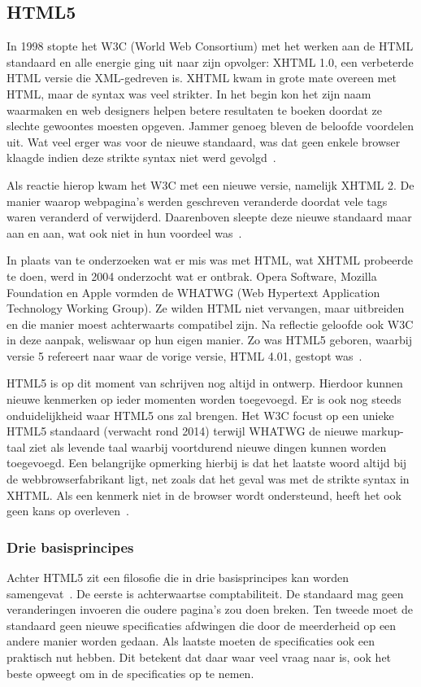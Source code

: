 \subsection{HTML5}
In 1998 stopte het W3C (World Web Consortium) met het werken aan de HTML standaard en alle energie ging uit naar zijn opvolger: XHTML 1.0, een verbeterde HTML versie die XML-gedreven is. XHTML kwam in grote mate overeen met HTML, maar de syntax was veel strikter. In het begin kon het zijn naam waarmaken en web designers helpen betere resultaten te boeken doordat ze slechte gewoontes moesten opgeven. Jammer genoeg bleven de beloofde voordelen uit. Wat veel erger was voor de nieuwe standaard, was dat geen enkele browser klaagde indien deze strikte syntax niet werd gevolgd~\cite{MacDonald2011}.

Als reactie hierop kwam het W3C met een nieuwe versie, namelijk XHTML 2. De manier waarop webpagina's werden geschreven veranderde doordat vele tags waren veranderd of verwijderd. Daarenboven sleepte deze nieuwe standaard maar aan en aan, wat ook niet in hun voordeel was~\cite{MacDonald2011}. 

In plaats van te onderzoeken wat er mis was met HTML, wat XHTML probeerde te doen, werd in 2004 onderzocht wat er ontbrak. Opera Software, Mozilla Foundation en Apple vormden de WHATWG (Web Hypertext Application Technology Working Group). Ze wilden HTML niet vervangen, maar uitbreiden en die manier moest achterwaarts compatibel zijn. Na reflectie geloofde ook W3C in deze aanpak, weliswaar op hun eigen manier.  Zo was HTML5 geboren, waarbij versie 5 refereert naar waar de vorige versie, HTML 4.01, gestopt was~\cite{MacDonald2011}.

HTML5 is op dit moment van schrijven nog altijd in ontwerp. Hierdoor kunnen nieuwe kenmerken op ieder momenten worden toegevoegd.  Er is ook nog steeds onduidelijkheid waar HTML5 ons zal brengen.  Het W3C focust op een unieke HTML5 standaard (verwacht rond 2014) terwijl WHATWG de nieuwe markup-taal ziet als levende taal waarbij voortdurend  nieuwe dingen kunnen worden toegevoegd. Een belangrijke opmerking hierbij is dat het laatste woord altijd bij de webbrowserfabrikant ligt, net zoals dat het geval was met de strikte syntax in XHTML. Als een kenmerk niet in de browser wordt ondersteund, heeft het ook geen kans op overleven~\cite{MacDonald2011}.

\subsubsection{Drie basisprincipes}
Achter HTML5 zit een filosofie die in drie basisprincipes kan worden samengevat~\cite{MacDonald2011}.  De eerste is achterwaartse comptabiliteit. De standaard mag geen veranderingen invoeren die oudere pagina's zou doen breken. Ten tweede moet de standaard geen nieuwe specificaties afdwingen die door de meerderheid op een andere manier worden gedaan. Als laatste moeten de specificaties ook een praktisch nut hebben. Dit betekent dat daar waar veel vraag naar is, ook het beste opweegt om in de specificaties op te nemen.

